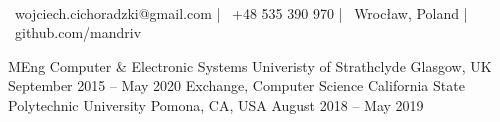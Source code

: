 \documentclass[]{awesome-cv}
\begin{document}
\begin{center}
	  \\
	\vspace{2mm}
	{\faEnvelope\ wojciech.cichoradzki@gmail.com} | {\faMobile\ +48 535 390 970} | {\faMapMarker\ Wrocław, Poland} | {\faLink\ github.com/mandriv}
\end{center}
\begin{cventries}
	\cventry
	{MEng Computer \& Electronic Systems}
	{Univeristy of Strathclyde}
	{Glasgow, UK}
	{September 2015 – May 2020}
	{}
	\cventry
	{Exchange, Computer Science}
	{California State Polytechnic University}
	{Pomona, CA, USA}
	{August 2018 – May 2019}
	{}
\end{cventries}
\end{document}
